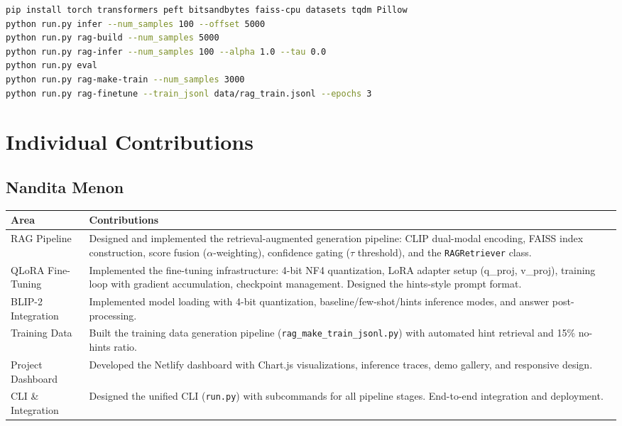 \documentclass[12pt, a4paper]{article}
\begin{document}
\begin{lstlisting}[language=bash, caption={Full reproduction pipeline.}]
pip install torch transformers peft bitsandbytes faiss-cpu datasets tqdm Pillow
python run.py infer --num_samples 100 --offset 5000
python run.py rag-build --num_samples 5000
python run.py rag-infer --num_samples 100 --alpha 1.0 --tau 0.0
python run.py eval
python run.py rag-make-train --num_samples 3000
python run.py rag-finetune --train_jsonl data/rag_train.jsonl --epochs 3
\end{lstlisting}

\section{Individual Contributions}

\subsection{Nandita Menon}

\begin{table}[H]
\centering
\renewcommand{\arraystretch}{1.3}
\begin{tabularx}{\textwidth}{@{} l X @{}}
\toprule
\textbf{Area} & \textbf{Contributions} \\
\midrule
RAG Pipeline & Designed and implemented the retrieval-augmented generation pipeline: CLIP dual-modal encoding, FAISS index construction, score fusion ($\alpha$-weighting), confidence gating ($\tau$ threshold), and the \texttt{RAGRetriever} class. \\
\addlinespace
QLoRA Fine-Tuning & Implemented the fine-tuning infrastructure: 4-bit NF4 quantization, LoRA adapter setup (q\_proj, v\_proj), training loop with gradient accumulation, checkpoint management. Designed the hints-style prompt format. \\
\addlinespace
BLIP-2 Integration & Implemented model loading with 4-bit quantization, baseline/few-shot/hints inference modes, and answer post-processing. \\
\addlinespace
Training Data & Built the training data generation pipeline (\texttt{rag\_make\_train\_jsonl.py}) with automated hint retrieval and 15\% no-hints ratio. \\
\addlinespace
Project Dashboard & Developed the Netlify dashboard with Chart.js visualizations, inference traces, demo gallery, and responsive design. \\
\addlinespace
CLI \& Integration & Designed the unified CLI (\texttt{run.py}) with subcommands for all pipeline stages. End-to-end integration and deployment. \\
\bottomrule
\end{tabularx}
\end{table}
\end{document}
